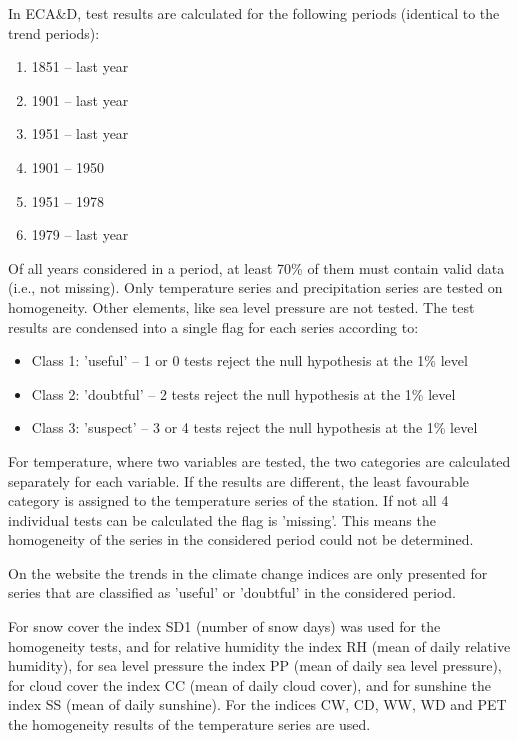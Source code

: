 \documentclass[a4paper,11pt]{article}
\begin{document}
In ECA\&D, test results are calculated for the following periods
(identical to the trend periods):
\begin{enumerate}
\item 1851 -- last year
\item 1901 -- last year 
\item 1951 -- last year
\item 1901 -- 1950 
\item 1951 -- 1978
\item 1979 -- last year
\end{enumerate}
Of all years considered in a period, at least 70\% of them must
contain valid data (i.e., not missing). Only temperature series and
precipitation series are tested on homogeneity. Other elements, like
sea level pressure are not tested. The test results are condensed
into a single flag for each series according to:
\begin{itemize}
\item Class 1: 'useful' -- 1 or 0 tests reject the null hypothesis at
the 1\% level 
\item Class 2: 'doubtful' -- 2 tests reject the null hypothesis at the
1\% level
\item Class 3: 'suspect' -- 3 or 4 tests reject the null hypothesis at
the 1\% level
\end{itemize}

For temperature, where two variables are tested, the two categories
are calculated separately for each variable. If the results are
different, the least favourable category is assigned to the
temperature series of the station. If not all 4 individual tests can
be calculated the flag is 'missing'. This means the homogeneity of the
series in the considered period could not be determined.

On the website the trends in the climate change indices are only
presented for series that are classified as 'useful' or 'doubtful' in
the considered period.

For snow cover the index SD1 (number of snow days) was used for the
homogeneity tests, and for relative humidity the index RH (mean of daily
relative humidity), for sea level pressure the index PP (mean of daily
sea level pressure), for cloud cover the index CC (mean of daily cloud
cover), and for sunshine the index SS (mean of daily sunshine). For
the indices CW, CD, WW, WD and PET the homogeneity results of the
temperature series are used.


\end{document}
